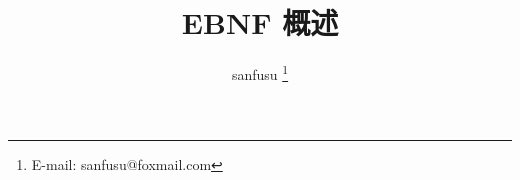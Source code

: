\documentclass[draft]{ctexart}
\begin{document}
\title{EBNF 概述}
\author{sanfusu \thanks{E-mail: sanfusu@foxmail.com}}
\maketitle
\end{document}
